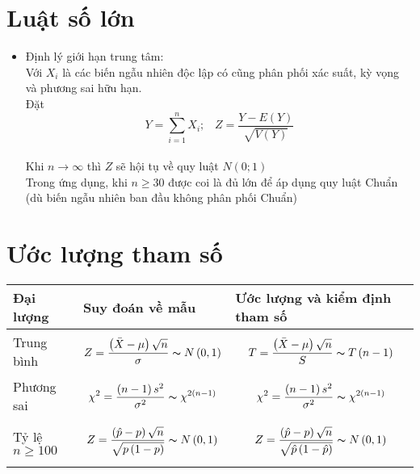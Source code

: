 \documentclass[utf8,a4paper]{article}
\begin{document}
\section[]{Luật số lớn}
\begin{itemize}
  \item Định lý giới hạn trung tâm: \\
    Với \({X}_{i}\) là các biến ngẫu nhiên độc lập có cũng phân phối xác suất,
    kỳ vọng và phương sai hữu hạn. \\
    Đặt
      \[Y = \sum^{n}_{i = 1}{{X}_{i}}; \;\;\; Z = \frac{Y - E\left(Y\right)}{\sqrt{V\left(Y\right)}}\] \\
    Khi \(n \rightarrow \infty\) thì \(Z\) sẽ hội tụ về quy luật \(N\left(0; 1\right)\) \\
    Trong ứng dụng, khi \(n \geq 30\) được coi là đủ lớn để áp dụng quy luật Chuẩn
      (dù biến ngẫu nhiên ban đầu không phân phối Chuẩn)
\end{itemize}

\section[]{Ước lượng tham số}

\begin{center}
  \begin{tabularx}{14.32cm} {
    | >{\centering\arraybackslash} m{3cm}
    | >{\centering\arraybackslash} m{5cm}
    | >{\centering\arraybackslash} m{5cm} | }
    \hline
      Đại lượng &
      Suy đoán về mẫu &
      Ước lượng và kiểm định tham số \\
    \hline
      Trung bình &
      \[Z = \frac{\left(\bar{X} - \mu\right) \sqrt{n}}{\sigma} \thicksim N\left(0, 1\right)\] &
      \[T = \frac{\left(\bar{X} - \mu\right) \sqrt{n}}{S} \thicksim T\left(n - 1\right)\] \\
    \hline
      Phương sai &
      \[{\chi}^{2} = \frac{\left(n - 1\right) {s}^{2}}{{\sigma}^{2}} \thicksim {\chi}^{2\left(n - 1\right)}\] &
      \[{\chi}^{2} = \frac{\left(n - 1\right) {s}^{2}}{{\sigma}^{2}} \thicksim {\chi}^{2\left(n - 1\right)}\] \\
    \hline
      Tỷ lệ \linebreak \(n \geq 100\) &
      \[Z = \frac{\left(\hat{p} - p\right) \sqrt{n}}{\sqrt{p\left(1 - p\right)}} \thicksim N\left(0, 1\right)\] &
      \[Z = \frac{\left(\hat{p} - p\right) \sqrt{n}}{\sqrt{\hat{p}\left(1 - \hat{p}\right)}} \thicksim N\left(0, 1\right)\] \\
    \hline
  \end{tabularx}
\end{center}
\end{document}
